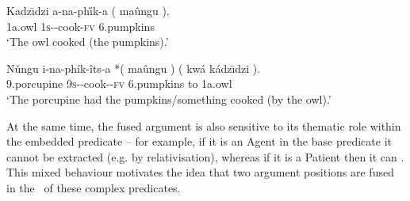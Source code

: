 \documentclass[output=paper]{langscibook}
\begin{document}
\ea
\gll Kadz\={\i}dzi a-na-ph\H{\i}k-a ( {ma\^{u}ngu )}.\\
1a.owl 1\textsc{s}-\PST-cook-\textsc{fv} {} 6.pumpkins\\
\glt `The owl cooked (the pumpkins).'
\z

\ea
\gll N\v{u}ngu i-na-ph\'{i}k-\^{i}ts-a *( {ma\^{u}ngu )} ( kw\'{a} k\'{a}dz\={\i}dzi ). \\
9.porcupine 9\textsc{s}-\PST-cook-\CAUS-\textsc{fv} {} 6.pumpkins {} to
1a.owl \\
\glt `The porcupine had the pumpkins\slash something cooked (by the owl).'
\z
%

At the same time, the fused argument is also sensitive to its thematic role
within the embedded predicate -- for example, if it is an Agent in the base
predicate it cannot be extracted (e.g. by relativisation), whereas if it is a
Patient then it can \citep[529--530]{Alsina1992}. This mixed behaviour motivates
the idea that two argument positions are fused in the \astruc\ of these complex
predicates.
\end{document}
